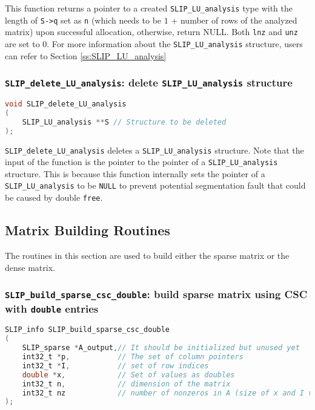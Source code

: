 \documentclass[11pt]{article}
\theoremstyle{definition}
\begin{document}
This function returns a pointer to a created \verb|SLIP_LU_analysis| type
with the length of \verb|S->q| set as \verb|n| (which needs to be $1$ + number of rows of the analyzed matrix) upon successful allocation, otherwise, return NULL. Both \verb|lnz| and \verb|unz| are set to 0. For more information about the \verb|SLIP_LU_analysis| structure, users can refer to Section \ref{ss:SLIP_LU_analysis}

\cprotect\subsubsection{\verb|SLIP_delete_LU_analysis|: delete \verb|SLIP_LU_analysis| structure}\label{ss:delete_LU_analysis}
\begin{lstlisting}[language=C,frame=single]
void SLIP_delete_LU_analysis
(
    SLIP_LU_analysis **S // Structure to be deleted
);
\end{lstlisting}

\verb|SLIP_delete_LU_analysis| deletes a \verb|SLIP_LU_analysis| structure. Note that the input of the function is the pointer to the pointer of a \verb|SLIP_LU_analysis| structure. This is because this function internally sets the pointer of a \verb|SLIP_LU_analysis| to be \verb|NULL| to prevent potential segmentation fault that could be caused by double \verb|free|.



\subsection{Matrix Building Routines} \label{s:Matrix_building_routines}

The routines in this section are used to build either the sparse matrix or the dense matrix.

\cprotect\subsubsection{\verb|SLIP_build_sparse_csc_double|: build sparse matrix using CSC with \verb|double| entries}\label{s:user:build_sparse_csc_double}
\begin{lstlisting}[language=C,frame=single]
SLIP_info SLIP_build_sparse_csc_double
(
    SLIP_sparse *A_output,// It should be initialized but unused yet
    int32_t *p,           // The set of column pointers
    int32_t *I,           // set of row indices
    double *x,            // Set of values as doubles
    int32_t n,            // dimension of the matrix
    int32_t nz            // number of nonzeros in A (size of x and I vectors)
);
\end{lstlisting}
\end{document}
